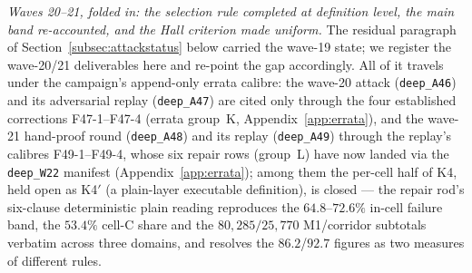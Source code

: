 \emph{Waves 20--21, folded in: the selection rule completed at definition level, the
main band re-accounted, and the Hall criterion made uniform.} The residual paragraph of
Section~\ref{subsec:attackstatus} below carried the wave-19 state; we register the
wave-20/21 deliverables here and re-point the gap accordingly. All of it travels under
the campaign's append-only errata calibre: the wave-20 attack (\texttt{deep\_A46}) and its
adversarial replay (\texttt{deep\_A47}) are cited only through the four established
corrections F47-1--F47-4 (errata group~K, Appendix~\ref{app:errata}), and the wave-21
hand-proof round (\texttt{deep\_A48}) and its replay (\texttt{deep\_A49}) through the
replay's calibres F49-1--F49-4, whose six repair rows (group~L) have now landed via the
\texttt{deep\_W22} manifest (Appendix~\ref{app:errata}); among them the per-cell half
of K4, held open as K4$'$ (a plain-layer executable definition), is closed --- the
repair rod's six-clause deterministic plain reading reproduces the
$64.8$--$72.6\%$ in-cell failure band, the $53.4\%$ cell-C share and the
$80{,}285/25{,}770$ M1/corridor subtotals verbatim across three domains, and resolves
the $86.2$/$92.7$ figures as two measures of different rules.

